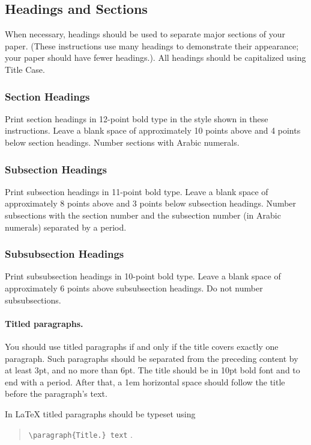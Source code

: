 \documentclass{article}
\begin{document}
\subsection{Headings and Sections}

When necessary, headings should be used to separate major sections of
your paper. (These instructions use many headings to demonstrate their
appearance; your paper should have fewer headings.). All headings should be capitalized using Title Case.

\subsubsection{Section Headings}

Print section headings in 12-point bold type in the style shown in
these instructions. Leave a blank space of approximately 10 points
above and 4 points below section headings.  Number sections with
Arabic numerals.

\subsubsection{Subsection Headings}

Print subsection headings in 11-point bold type. Leave a blank space
of approximately 8 points above and 3 points below subsection
headings. Number subsections with the section number and the
subsection number (in Arabic numerals) separated by a
period.

\subsubsection{Subsubsection Headings}

Print subsubsection headings in 10-point bold type. Leave a blank
space of approximately 6 points above subsubsection headings. Do not
number subsubsections.

\paragraph{Titled paragraphs.} You should use titled paragraphs if and
only if the title covers exactly one paragraph. Such paragraphs should be
separated from the preceding content by at least 3pt, and no more than
6pt. The title should be in 10pt bold font and to end with a period.
After that, a 1em horizontal space should follow the title before
the paragraph's text.

In \LaTeX{} titled paragraphs should be typeset using
\begin{quote}
    {\tt \textbackslash{}paragraph\{Title.\} text} .
\end{quote}
\end{document}
